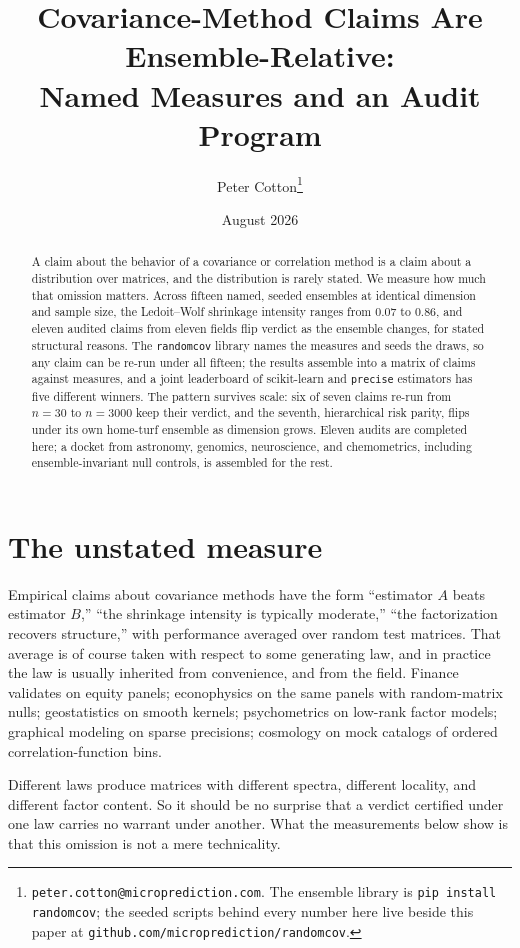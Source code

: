 \documentclass[11pt]{article}
\title{Covariance-Method Claims Are Ensemble-Relative:\\
Named Measures and an Audit Program}
\author{Peter Cotton\thanks{\texttt{peter.cotton@microprediction.com}. The
ensemble library is \texttt{pip install randomcov}; the seeded scripts behind
every number here live beside this paper at
\texttt{github.com/microprediction/randomcov}.}}
\date{August 2026}
\begin{document}
\maketitle

\begin{abstract}
A claim about the behavior of a covariance or correlation method is a
claim about a distribution over matrices, and the distribution is rarely
stated. We measure how much that omission matters. Across fifteen named,
seeded ensembles at identical dimension and sample size, the
Ledoit--Wolf shrinkage intensity ranges from $0.07$ to $0.86$, and eleven
audited claims from eleven fields flip verdict as the ensemble changes,
for stated structural reasons. The \texttt{randomcov} library names the
measures and seeds the draws, so any claim can be re-run under all
fifteen; the results assemble into a matrix of claims against measures,
and a joint leaderboard of scikit-learn and \texttt{precise} estimators
has five different winners. The pattern survives scale: six of seven
claims re-run from $n=30$ to $n=3000$ keep their verdict, and the
seventh, hierarchical risk parity, flips under its own home-turf
ensemble as dimension grows. Eleven audits are completed here; a docket
from astronomy, genomics, neuroscience, and chemometrics, including
ensemble-invariant null controls, is assembled for the rest.
\end{abstract}

\section{The unstated measure}

Empirical claims about covariance methods have the form ``estimator $A$
beats estimator $B$,'' ``the shrinkage intensity is typically moderate,''
``the factorization recovers structure,'' with performance averaged over
random test matrices. That average is of course taken with respect to
some generating law, and in practice the law is usually inherited from
convenience, and from the field. Finance validates on equity panels;
econophysics on the same panels with random-matrix nulls; geostatistics
on smooth kernels; psychometrics on low-rank factor models; graphical
modeling on sparse precisions; cosmology on mock catalogs of ordered
correlation-function bins.

Different laws produce matrices with different spectra, different
locality, and different factor content. So it should be no surprise that
a verdict certified under one law carries no warrant under another. What
the measurements below show is that this omission is not a mere
technicality.
\end{document}
